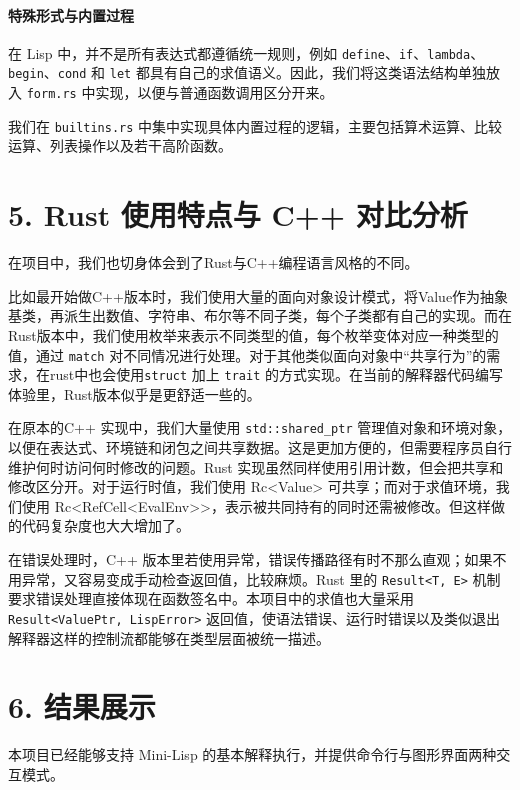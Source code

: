 \documentclass[12pt, a4paper]{ctexart}
\begin{document}
\paragraph*{特殊形式与内置过程}
在 Lisp 中，并不是所有表达式都遵循统一规则，例如 \verb|define|、\verb|if|、\verb|lambda|、\verb|begin|、\verb|cond| 和 \verb|let| 都具有自己的求值语义。因此，我们将这类语法结构单独放入 \verb|form.rs| 中实现，以便与普通函数调用区分开来。

我们在 \verb|builtins.rs| 中集中实现具体内置过程的逻辑，主要包括算术运算、比较运算、列表操作以及若干高阶函数。

\section*{5. Rust 使用特点与 C++ 对比分析}

在项目中，我们也切身体会到了Rust与C++编程语言风格的不同。

比如最开始做C++版本时，我们使用大量的面向对象设计模式，将Value作为抽象基类，再派生出数值、字符串、布尔等不同子类，每个子类都有自己的实现。而在Rust版本中，我们使用枚举来表示不同类型的值，每个枚举变体对应一种类型的值，通过 \verb|match| 对不同情况进行处理。对于其他类似面向对象中“共享行为”的需求，在rust中也会使用\verb|struct| 加上 \verb|trait| 的方式实现。在当前的解释器代码编写体验里，Rust版本似乎是更舒适一些的。

在原本的C++ 实现中，我们大量使用 \verb|std::shared_ptr| 管理值对象和环境对象，以便在表达式、环境链和闭包之间共享数据。这是更加方便的，但需要程序员自行维护何时访问何时修改的问题。Rust 实现虽然同样使用引用计数，但会把共享和修改区分开。对于运行时值，我们使用 Rc<Value> 可共享；而对于求值环境，我们使用 Rc<RefCell<EvalEnv>>，表示被共同持有的同时还需被修改。但这样做的代码复杂度也大大增加了。

在错误处理时，C++ 版本里若使用异常，错误传播路径有时不那么直观；如果不用异常，又容易变成手动检查返回值，比较麻烦。Rust 里的 \verb|Result<T, E>| 机制要求错误处理直接体现在函数签名中。本项目中的求值也大量采用 \verb|Result<ValuePtr, LispError>| 返回值，使语法错误、运行时错误以及类似退出解释器这样的控制流都能够在类型层面被统一描述。

\section*{6. 结果展示}

本项目已经能够支持 Mini-Lisp 的基本解释执行，并提供命令行与图形界面两种交互模式。
\end{document}
